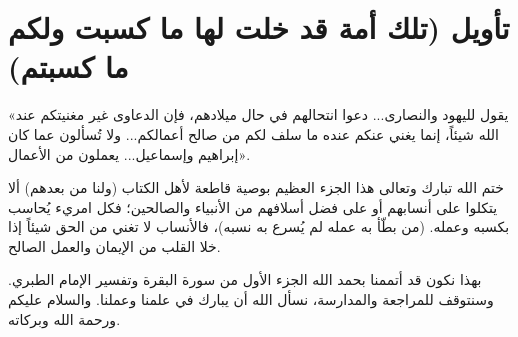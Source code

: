 \separator

\section{تأويل (تلك أمة قد خلت لها ما كسبت ولكم ما كسبتم)}
 «يقول لليهود والنصارى... دعوا انتحالهم في حال ميلادهم، فإن الدعاوى غير مغنيتكم عند الله شيئاً، إنما يغني عنكم عنده ما سلف لكم من صالح أعمالكم... ولا تُسألون عما كان إبراهيم وإسماعيل... يعملون من الأعمال».

\begin{fawaid}
ختم الله تبارك وتعالى هذا الجزء العظيم بوصية قاطعة لأهل الكتاب (ولنا من بعدهم) ألا يتكلوا على أنسابهم أو على فضل أسلافهم من الأنبياء والصالحين؛ فكل امريء يُحاسب بكسبه وعمله. (من بطّأ به عمله لم يُسرع به نسبه)، فالأنساب لا تغني من الحق شيئاً إذا خلا القلب من الإيمان والعمل الصالح.
\end{fawaid}

\separator

بهذا نكون قد أتممنا بحمد الله الجزء الأول من سورة البقرة وتفسير الإمام الطبري. وسنتوقف للمراجعة والمدارسة، نسأل الله أن يبارك في علمنا وعملنا. والسلام عليكم ورحمة الله وبركاته.
